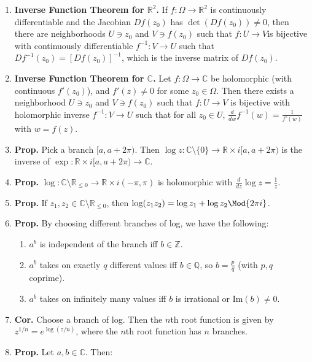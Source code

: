 \begin{enumerate}
\begin{enumerate}
    \end{enumerate}
    \item \textbf{Inverse Function Theorem for $\mathbb{R}^2$. } If $f: \Omega \to \mathbb{R}^2$ is continuously differentiable and the Jacobian $Df(z_0)$ has $\det(Df(z_0)) \neq 0$, then there are neighborhoods $U \ni z_0$ and $V \ni f(z_0)$ such that $f: U \to V$is bijective with continuously differentiable $f^{-1}: V \to U$ such that $Df^{-1}(z_0) = [Df(z_0)]^{-1}$, which is the inverse matrix of $Df(z_0)$. 
    \item \textbf{Inverse Function Theorem for $\mathbb{C}$. } Let $f: \Omega \to \mathbb{C}$ be holomorphic (with continuous $f'(z_0)$), and $f'(z) \neq 0$ for some $z_0 \in \Omega$. Then there exists a neighborhood $U \ni z_0$ and $V \ni f(z_0)$ such that $f: U \to V$ is bijective with holomorphic inverse $f^{-1}: V \to U$ such that for all $z_0 \in U$, $\frac{d}{dw} f^{-1}(w) = \frac{1}{f'(w)}$ with $w = f(z)$. 
    \item \textbf{Prop. } Pick a branch $[a, a+2\pi)$. Then $\log z: \mathbb{C} \setminus \{0\} \to \mathbb{R} \times i[a, a + 2\pi)$ is the inverse of $\exp: \mathbb{R} \times i[a, a+2\pi) \to \mathbb{C}$. 
    \item \textbf{Prop. } $\log: \mathbb{C} \setminus \mathbb{R}_{\leq 0} \to \mathbb{R} \times i(-\pi,\pi)$ is holomorphic with $\frac{d}{dz} \log z = \frac{1}{z}$. 
    \item \textbf{Prop. } If $z_1,z_2 \in \mathbb{C} \setminus \mathbb{R}_{\leq 0}$, then $\log(z_1z_2) = \log z_1 + \log z_2 \Mod{2\pi i}$. 
    \item \textbf{Prop. } By choosing different branches of log, we have the following: 
    \begin{enumerate}
        \item $a^b$ is independent of the branch iff $b \in \mathbb{Z}$. 
        \item $a^b$ takes on exactly $q$ different values iff $b \in \mathbb{Q}$, so $b = \frac{p}{q}$ (with $p,q$ coprime). 
        \item $a^b$ takes on infinitely many values iff $b$ is irrational or $\textrm{Im}(b) \neq 0$. 
    \end{enumerate}
    \item \textbf{Cor. } Choose a branch of log. Then the $n$th root function is given by $z^{1/n} = e^{\log (z/n)}$, where the $n$th root function has $n$ branches. 
    \item \textbf{Prop. } Let $a,b \in \mathbb{C}$. Then: 
    \begin{enumerate}

\end{enumerate}
\end{enumerate}
